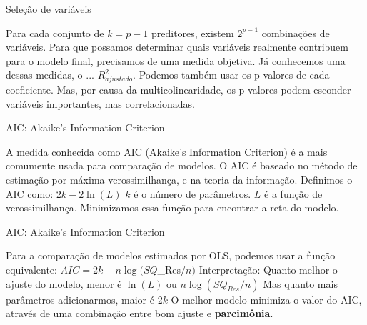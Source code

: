 \documentclass{beamer}\usepackage[]{graphicx}\usepackage[]{color}
\begin{document}
\begin{frame}{Seleção de variáveis}

Para cada conjunto de $k = p -1$ preditores, existem $2^{p-1}$ combinações de variáveis.
\pause
\vfill
Para que possamos determinar quais variáveis realmente contribuem para o modelo final, precisamos de uma medida objetiva. \pause
\vfill
Já conhecemos uma dessas medidas, o ... \pause $R^2 _{ajustado}$. \pause
\vfill
Podemos também usar os p-valores de cada coeficiente. \pause
\vfill
Mas, por causa da multicolinearidade, os p-valores podem esconder variáveis importantes, mas correlacionadas.

\end{frame}

\begin{frame}{AIC: Akaike's Information Criterion}

A medida conhecida como AIC (Akaike's Information Criterion) é a mais comumente usada para comparação de modelos. \pause
\vfill
O AIC é baseado no método de estimação por máxima verossimilhança, e na teoria da informação. \pause
\vfill
Definimos o AIC como:
\vfill
$2k - 2\ln(L)$
\vfill
$k$ é o número de parâmetros.
\vfill
$L$ é a função de verossimilhança. Minimizamos essa função para encontrar a reta do modelo.

\end{frame}

\begin{frame}{AIC: Akaike's Information Criterion}

Para a comparação de modelos estimados por OLS, podemos usar a função equivalente: 
\vfill
$AIC = 2k + n\log(SQ$_{Res}$/n)$ \pause
\vfill
Interpretação: 
\vfill
Quanto melhor o ajuste do modelo, menor é $\ln(L)$ ou $n\log(SQ_{Res}/n)$ \pause
\vfill
Mas quanto mais parâmetros adicionarmos, maior é $2k$ \pause
\vfill
O melhor modelo minimiza o valor do AIC, através de uma combinação entre bom ajuste e \textbf{parcimônia}.
\end{frame}
\end{document}
